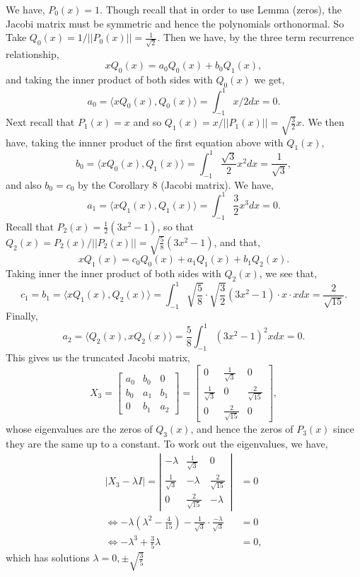 \documentclass[12pt,a4paper]{article}
\begin{document}
We have, $P_0(x) = 1$. Though recall that in order to use Lemma (zeros), the Jacobi matrix must be symmetric and hence the polynomials orthonormal. So Take $Q_0(x) = 1/||P_0(x)|| = \frac{1}{\sqrt{2}}$. Then we have, by the three term recurrence relationship,
\[
xQ_0(x) = a_0Q_0(x) + b_0Q_1(x),
\]
and taking the inner product of both sides with $Q_0(x)$ we get,
\[
a_0 = \ensuremath{\langle} xQ_0(x), Q_0(x) \ensuremath{\rangle} = \int_{-1}^1 x/2 dx = 0.
\]
Next recall that $P_1(x) =  x$ and so $Q_1(x) = x/||P_1(x)||=\sqrt{\frac{3}{2}} x$. We then have, taking the innner product of the first equation above with $Q_ 1(x)$,
\[
b_0 = \ensuremath{\langle} xQ_0(x), Q_1(x)\ensuremath{\rangle} = \int_{-1}^1 \frac{\sqrt{3}}{2}x^2 dx = \frac{1}{\sqrt{3}},
\]
and also $b_0 = c_0$ by the Corollary 8 (Jacobi matrix). We have,
\[
a_1 = \ensuremath{\langle} xQ_1(x), Q_1(x)\ensuremath{\rangle} = \int_{-1}^1 \frac{3}{2}x^3 dx = 0.
\]
Recall that $P_2(x) = \frac{1}{2}(3x^2 - 1)$, so that $Q_2(x) = P_2(x)/||P_2(x)|| = \sqrt{\frac{5}{8}}(3x^2 - 1)$, and that,
\[
xQ_1(x) = c_0Q_0(x) + a_1Q_1(x) + b_1Q_2(x).
\]
Taking inner the inner product of both sides with $Q_2(x)$, we see that,
\[
c_1 = b_1 = \ensuremath{\langle} xQ_1(x), Q_2(x)\ensuremath{\rangle} = \int_{-1}^1 \sqrt{\frac{5}{8}} \cdot \sqrt{\frac{3}{2}}(3x^2 - 1)\cdot x \cdot xdx =\frac{2}{\sqrt{15}}.
\]
Finally,
\[
a_2 = \ensuremath{\langle} Q_2(x), xQ_2(x) \ensuremath{\rangle} = \frac{5}{8}\int_{-1}^1 (3x^2 - 1)^2 x dx = 0.
\]
This gives us the truncated Jacobi matrix,
\[
X_3 = \left[\begin{matrix}
a_0 & b_0	& 0 \\
b_0 & a_1 & b_1 \\
0&b_1 & a_2
\end{matrix}
 \right] = \left[\begin{matrix}
0 & \frac{1}{\sqrt{3}}	& 0 \\
\frac{1}{\sqrt{3}} & 0 & \frac{2}{\sqrt{15}} \\
0& \frac{2}{\sqrt{15}} & 0
\end{matrix}
 \right],
\]
whose eigenvalues are the zeros of $Q_3(x)$, and hence the zeros of $P_3(x)$ since they are the same up to a constant. To work out the eigenvalues, we have,
\begin{align*}
	|X_3 - \lambda I| = \left| \begin{matrix}
		-\lambda & \frac{1}{\sqrt{3}} & 0\\
		\frac{1}{\sqrt{3}} & -\lambda & \frac{2}{\sqrt{15}}\\
		0 & \frac{2}{\sqrt{15}} & -\lambda
	\end{matrix}\right| &= 0 \\
	\Leftrightarrow -\lambda(\lambda^2 - \frac{4}{15}) - \frac{1}{\sqrt{3}}\cdot \frac{-\lambda}{\sqrt{3}} &=0 \\
	\Leftrightarrow -\lambda^3 + \frac{3}{5}\lambda &= 0,
\end{align*}
which has solutions $\lambda = 0, \ensuremath{\pm} \sqrt{\frac{3}{5}}$
\end{document}
